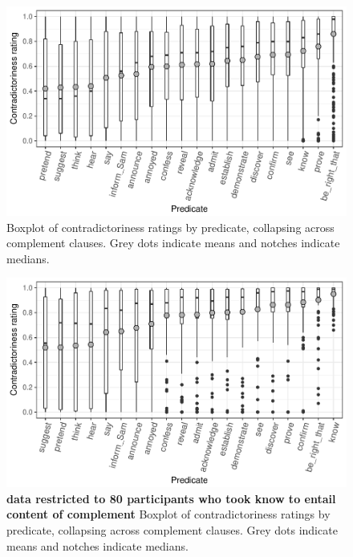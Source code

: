 \documentclass[11pt,fleqn]{article}
\newcommand{\6}{\mbox{$[\hspace*{-.6mm}[$}}
\newcommand{\9}{\mbox{$]\hspace*{-.6mm}]$}}
\begin{document}
\begin{figure}[h!]
\centering

\includegraphics[width=.8\paperwidth]{../results/2-veridicality/graphs/boxplot-veridicality}

\caption{Boxplot of contradictoriness ratings by predicate, collapsing across complement clauses. Grey dots indicate means and notches indicate medians.}
\label{f-veridicality-predicate}
\end{figure}

\begin{figure}[h!]
\centering

\includegraphics[width=.8\paperwidth]{../results/2-veridicality/graphs/boxplot-veridicality-restricted}

\caption{{\bf data restricted to 80 participants who took know to entail content of complement} Boxplot of contradictoriness ratings by predicate, collapsing across complement clauses. Grey dots indicate means and notches indicate medians.}
\label{f-veridicality-predicate}
\end{figure}
\end{document}
